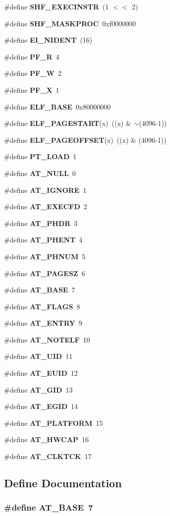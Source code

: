 \begin{CompactItemize}
\#define {\bf SHF\_\-EXECINSTR}~(1 $<$$<$ 2)
\item 
\#define {\bf SHF\_\-MASKPROC}~0xf0000000
\item 
\#define {\bf EI\_\-NIDENT}~(16)
\item 
\#define {\bf PF\_\-R}~4
\item 
\#define {\bf PF\_\-W}~2
\item 
\#define {\bf PF\_\-X}~1
\item 
\#define {\bf ELF\_\-BASE}~0x80000000
\item 
\#define {\bf ELF\_\-PAGESTART}(x)~((x) \& $\sim$(4096-1))
\item 
\#define {\bf ELF\_\-PAGEOFFSET}(x)~((x) \& (4096-1))
\item 
\#define {\bf PT\_\-LOAD}~1
\item 
\#define {\bf AT\_\-NULL}~0
\item 
\#define {\bf AT\_\-IGNORE}~1
\item 
\#define {\bf AT\_\-EXECFD}~2
\item 
\#define {\bf AT\_\-PHDR}~3
\item 
\#define {\bf AT\_\-PHENT}~4
\item 
\#define {\bf AT\_\-PHNUM}~5
\item 
\#define {\bf AT\_\-PAGESZ}~6
\item 
\#define {\bf AT\_\-BASE}~7
\item 
\#define {\bf AT\_\-FLAGS}~8
\item 
\#define {\bf AT\_\-ENTRY}~9
\item 
\#define {\bf AT\_\-NOTELF}~10
\item 
\#define {\bf AT\_\-UID}~11
\item 
\#define {\bf AT\_\-EUID}~12
\item 
\#define {\bf AT\_\-GID}~13
\item 
\#define {\bf AT\_\-EGID}~14
\item 
\#define {\bf AT\_\-PLATFORM}~15
\item 
\#define {\bf AT\_\-HWCAP}~16
\item 
\#define {\bf AT\_\-CLKTCK}~17
\end{CompactItemize}


\subsection{Define Documentation}
\subsubsection[{AT\_\-BASE}]{\setlength{\rightskip}{0pt plus 5cm}\#define AT\_\-BASE~7}\label{elf_8h_9b8e51a44a47d7ea827c570ffdca14e5}




